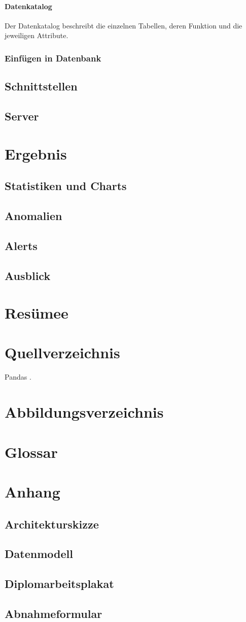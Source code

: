 \documentclass{report}
\begin{document}
\subsubsection{Datenkatalog}
Der Datenkatalog beschreibt die einzelnen Tabellen, deren Funktion und die jeweiligen Attribute.
\subsection{Einfügen in Datenbank}
\section{Schnittstellen}
\section{Server}


\chapter{Ergebnis}
\section{Statistiken und Charts}
\section{Anomalien}
\section{Alerts}
\section{Ausblick}

\chapter{Resümee}


\chapter*{Quellverzeichnis}
Pandas \citep{pandas_docs}.

\chapter*{Abbildungsverzeichnis}

\chapter*{Glossar}

\chapter*{Anhang}
\section{Architekturskizze}
\section{Datenmodell}
\section{Diplomarbeitsplakat}
\section{Abnahmeformular}
\end{document}
